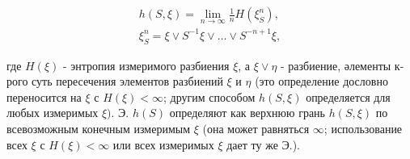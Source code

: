 \documentclass[10pt]{article}
\begin{document}
\[

\begin{gathered}

h(S, \xi)=\lim _{n \rightarrow \infty} \frac{1}{n} H\left(\xi_{S}^{n}\right), \\

\xi_{S}^{n}=\xi \vee S^{-1} \xi \vee \ldots \vee S^{-n+1} \xi,

\end{gathered}

\]



где $H(\xi)$ - энтропия измеримого разбиения $\xi$, а $\xi \vee \eta$ - разбиение, әлементы к-рого суть пересечения элементов разбиений $\xi$ и $\eta$ (это определение дословно переносится на $\xi$ с $H(\xi)<\infty$; другим способом $h(S, \xi)$ определяется для любых измеримых $\xi)$. Э. $h(S)$ определяют как верхнюю грань $h(S, \xi)$ по всевозможным конечным измеримым $\xi$ (она может равняться $\infty$; использование всех $\xi$ с $H(\xi)<\infty$ или всех измеримых $\xi$ дает ту же Э.).
\end{document}
